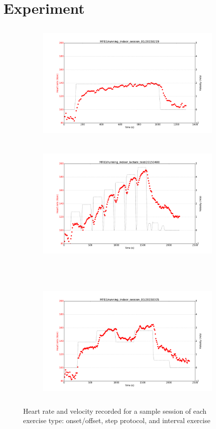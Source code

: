 \section{Experiment}
\begin{figure}[H]
    \centering
    \begin{subfigure}{\textwidth}
        \centering
        \includegraphics[height=6cm]{../images/plot_hbm_velocity-session1.png}
    \end{subfigure}%
    
    \begin{subfigure}{\textwidth}
        \centering
        \includegraphics[height=6cm]{../images/plot_hbm_velocity-lactate.png}
    \end{subfigure}
    \\
    \begin{subfigure}{\textwidth}
        \centering
        \includegraphics[height=6cm]{../images/plot_hbm_velocity-session3.png}
    \end{subfigure}
    \caption{Heart rate and velocity recorded for a sample session of each exercise type: onset/offset, step protocol, and interval exercise} \label{fig:data}
\end{figure}

